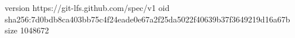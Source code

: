 version https://git-lfs.github.com/spec/v1
oid sha256:7d0bdb8ca403bb75c4f24eade0e67a2f25da5022f40639b37f3649219d16a67b
size 1048672
